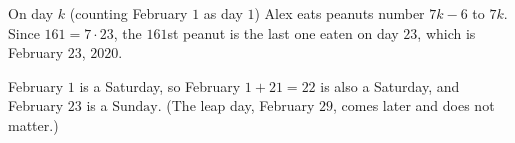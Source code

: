 On day $k$ (counting February $1$ as day $1$) Alex eats peanuts number $7k-6$ to $7k$. Since $161=7\cdot23$, the $161$st peanut is the last one eaten on day $23$, which is February $23$, $2020$.

February $1$ is a Saturday, so February $1+21=22$ is also a Saturday, and February $23$ is a $\boxed{\text{Sunday}}$. (The leap day, February $29$, comes later and does not matter.)
